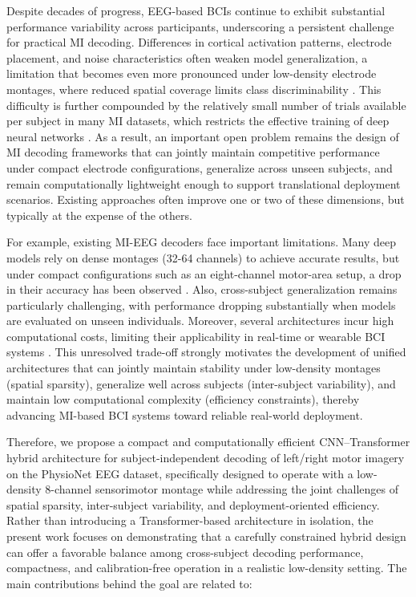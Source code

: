\documentclass[a4paper,fleqn]{cas-dc}
\begin{document}
Despite decades of progress, EEG-based BCIs continue to exhibit substantial performance variability across participants, underscoring a persistent challenge for practical MI decoding. Differences in cortical activation patterns, electrode placement, and noise characteristics often weaken model generalization, a limitation that becomes even more pronounced under low-density electrode montages, where reduced spatial coverage limits class discriminability \citep{Xu2020CrossDataset, abdullah2022eeg}. This difficulty is further compounded by the relatively small number of trials available per subject in many MI datasets, which restricts the effective training of deep neural networks \citep{Lotte2018EEGReview}. As a result, an important open problem remains the design of MI decoding frameworks that can jointly maintain competitive performance under compact electrode configurations, generalize across unseen subjects, and remain computationally lightweight enough to support translational deployment scenarios. Existing approaches often improve one or two of these dimensions, but typically at the expense of the others.

For example, existing MI-EEG decoders face important limitations. Many deep models rely on dense montages (32-64 channels) to achieve accurate results, but under compact configurations such as an eight-channel motor-area setup, a drop in their accuracy has been observed \citep{nagarajan2023relevance}. Also, cross-subject generalization remains particularly challenging, with performance dropping substantially when models are evaluated on unseen individuals. Moreover, several architectures incur high computational costs, limiting their applicability in real-time or wearable BCI systems \citep{wang2020accurate}. This unresolved trade-off strongly motivates the development of unified architectures that can jointly maintain stability under low-density montages (spatial sparsity), generalize well across subjects (inter-subject variability), and maintain low computational complexity (efficiency constraints), thereby advancing MI-based BCI systems toward reliable real-world deployment.


Therefore, we propose a compact and computationally efficient CNN–Transformer hybrid architecture for subject-independent decoding of left/right motor imagery on the PhysioNet EEG dataset, specifically designed to operate with a low-density 8-channel sensorimotor montage while addressing the joint challenges of spatial sparsity, inter-subject variability, and deployment-oriented efficiency. Rather than introducing a Transformer-based architecture in isolation, the present work focuses on demonstrating that a carefully constrained hybrid design can offer a favorable balance among cross-subject decoding performance, compactness, and calibration-free operation in a realistic low-density setting. The main contributions behind the goal are related to:
\end{document}
